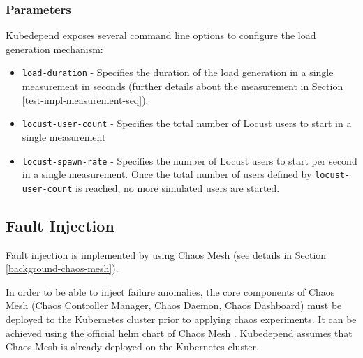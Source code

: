 
\subsubsection{Parameters}

Kubedepend exposes several command line options to configure the load generation mechanism:

\begin{itemize}
	\item \texttt{load-duration} - Specifies the duration of the load generation in a single measurement in seconds (further details about the measurement in Section \ref{test-impl-measurement-seq}). 
	\item \texttt{locust-user-count} - Specifies the total number of Locust users to start in a single measurement
	\item \texttt{locust-spawn-rate} - Specifies the number of Locust users to start per second in a single measurement. Once the total number of users defined by \texttt{locust-user-count} is reached, no more simulated users are started. 
\end{itemize}

\subsection{Fault Injection}


Fault injection is implemented by using Chaos Mesh (see details in Section \ref{background-chaos-mesh}).

In order to be able to inject failure anomalies, the core components of Chaos Mesh (Chaos Controller Manager, Chaos Daemon, Chaos Dashboard) must be deployed to the Kubernetes cluster prior to applying chaos experiments. It can be achieved using the official helm chart of Chaos Mesh \cite{ChaosMeshChart}. Kubedepend assumes that Chaos Mesh is already deployed on the Kubernetes cluster.

